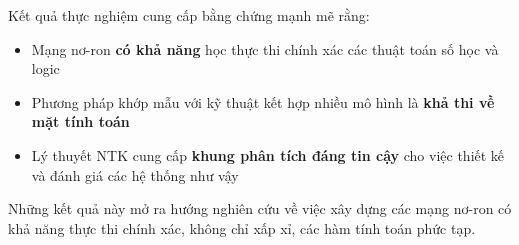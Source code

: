 Kết quả thực nghiệm cung cấp bằng chứng mạnh mẽ rằng:
\begin{itemize}
    \item Mạng nơ-ron \textbf{có khả năng} học thực thi chính xác các thuật toán số học và logic
    \item Phương pháp khớp mẫu với kỹ thuật kết hợp nhiều mô hình là \textbf{khả thi về mặt tính toán}
    \item Lý thuyết NTK cung cấp \textbf{khung phân tích đáng tin cậy} cho việc thiết kế và đánh giá các hệ thống như vậy
\end{itemize}

Những kết quả này mở ra hướng nghiên cứu về việc xây dựng các mạng nơ-ron có khả năng thực thi chính xác, không chỉ xấp xỉ, các hàm tính toán phức tạp.
